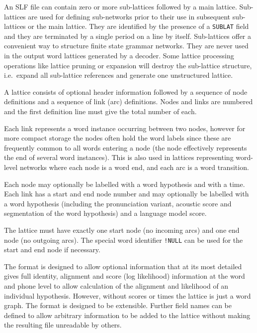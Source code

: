 An SLF file can contain zero or more sub-lattices
followed by a main lattice.  Sub-lattices are used for defining
sub-networks prior to their use in subsequent sub-lattices or the main
lattice.  They are identified by the presence of a
\texttt{SUBLAT} field and they are
terminated by a single period on a line by itself. Sub-lattices offer
a convenient way to structure finite state grammar networks. They are
never used in the output word lattices generated by a decoder. Some
lattice processing operations like lattice pruning or expansion will
destroy the sub-lattice structure, i.e.\ expand all sub-lattice
references and generate one unstructured lattice.

A lattice consists of optional header
information followed by a sequence of node definitions and a sequence
of link (arc) definitions. Nodes and links are numbered and the first
definition line must give the total number of each.

Each link represents a word instance occurring
between two nodes, however for more compact storage the nodes often
hold the word labels since these are frequently common to all words
entering a node (the node effectively represents the end of several
word instances). This is also used in lattices representing word-level
networks where each node is a word end, and each arc is a word
transition.

Each node may optionally be labelled with a word
hypothesis and with a time. Each link has a start and end node number
and may optionally be labelled with a word hypothesis (including the
pronunciation variant, acoustic score and segmentation of the word
hypothesis) and a language model score.

The lattice must have exactly one start node (no incoming arcs) and
one end node (no outgoing arcs). The special word identifier
\verb|!NULL| can be used for the start and end node if necessary.


The format is designed to allow optional
information that at its most detailed gives full identity, alignment
and score (log likelihood) information at the word and phone level to
allow calculation of the alignment and likelihood of an individual
hypothesis. However, without scores or times the lattice is just a
word graph. The format is designed to be extensible.  Further field
names can be defined to allow arbitrary information to be added to the
lattice without making the resulting file unreadable by others.

